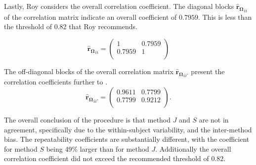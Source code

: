 Lastly, Roy considers the overall correlation coefficient. The diagonal blocks $\boldsymbol{\hat{r}_{\Omega}}_{ii}$ of the correlation matrix indicate an overall coefficient of $0.7959$. This is less than the threshold of 0.82 that Roy recommends.

\[
\boldsymbol{\hat{r}_{\Omega}}_{ii} = \left( \begin{array}{cc}
    1  & 0.7959  \\
    0.7959  & 1  \\
    \end{array}\right)
\]

The off-diagonal blocks of the overall correlation matrix $\boldsymbol{\hat{r}_{\Omega}}_{ii'}$ present the correlation coefficients further to \citet{hamlett}.
\[
\boldsymbol{\hat{r}_{\Omega}}_{ii'} = \left( \begin{array}{cc}
    0.9611  & 0.7799  \\
    0.7799  & 0.9212  \\
    \end{array}\right).
\]

The overall conclusion of the procedure is that method $J$ and $S$ are not in agreement, specifically due to the within-subject variability, and the inter-method bias. The repeatability coefficients are substantially different, with the coefficient for method $S$ being 49\% larger than for method $J$. Additionally the overall correlation coefficient did not exceed the recommended threshold of $0.82$.
